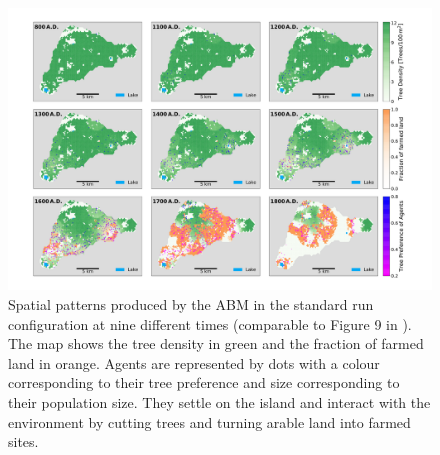\begin{figure}
	\centering
	\includegraphics[width=1.3\textwidth, center]{images/Results/Standard/Rull2020_Comparison_seed3}
	\caption{Spatial patterns produced by the ABM in the standard run configuration at nine different times (comparable to Figure 9 in ). The map shows the tree density in green and the fraction of farmed land in orange. Agents are represented by dots with a colour corresponding to their tree preference and size corresponding to their population size. They settle on the island and interact with the environment by cutting trees and turning arable land into farmed sites.}
	\label{fig:STDrull}
\end{figure}



